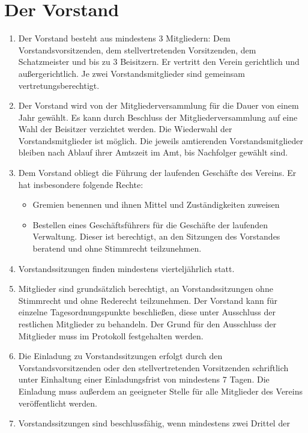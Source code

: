 \documentclass[a4paper,11pt]{scrartcl}
\begin{document}
\section{Der Vorstand}
\begin{enumerate}
  \item Der Vorstand besteht aus mindestens 3 Mitgliedern: Dem 
    Vorstandsvorsitzenden, dem stellvertretenden Vorsitzenden, dem Schatzmeister 
    und bis zu 3 Beisitzern. Er vertritt den Verein gerichtlich und 
    außergerichtlich. Je zwei Vorstandsmitglieder sind gemeinsam 
    vertretungsberechtigt.
  \item Der Vorstand wird von der Mitgliederversammlung für die Dauer von einem 
    Jahr gewählt. Es kann durch Beschluss der Mitgliederversammlung auf eine Wahl 
    der Beisitzer verzichtet werden. Die Wiederwahl der Vorstandsmitglieder ist 
    möglich. Die jeweils amtierenden Vorstandsmitglieder bleiben nach Ablauf ihrer 
    Amtszeit im Amt, bis Nachfolger gewählt sind.
  \item Dem Vorstand obliegt die Führung der laufenden Geschäfte des Vereins. 
    Er hat insbesondere folgende Rechte:
    \begin{itemize}
      \item Gremien benennen und ihnen Mittel und Zuständigkeiten zuweisen
      \item Bestellen eines Geschäftsführers für die Geschäfte der laufenden 
        Verwaltung. Dieser ist berechtigt, an den Sitzungen des Vorstandes beratend und 
        ohne Stimmrecht teilzunehmen.
    \end{itemize}
  \item Vorstandssitzungen finden mindestens vierteljährlich statt.
  \item Mitglieder sind grundsätzlich berechtigt, an Vorstandssitzungen ohne 
    Stimmrecht und ohne Rederecht teilzunehmen. Der Vorstand kann für einzelne 
    Tagesordnungspunkte beschließen, diese unter Ausschluss der restlichen 
    Mitglieder zu behandeln. Der Grund für den Ausschluss der Mitglieder muss im 
    Protokoll festgehalten werden.
  \item Die Einladung zu Vorstandssitzungen erfolgt durch den 
    Vorstandsvorsitzenden oder den stellvertretenden Vorsitzenden schriftlich unter 
    Einhaltung einer Einladungsfrist von mindestens 7 Tagen. Die Einladung muss 
    außerdem an geeigneter Stelle für alle Mitglieder des Vereins veröffentlicht 
    werden.
  \item Vorstandssitzungen sind beschlussfähig, wenn mindestens zwei Drittel der 

\end{enumerate}
\end{document}
